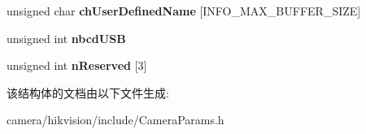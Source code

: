 \begin{DoxyCompactItemize}
\item 
\mbox{\label{struct___m_v___u_s_b3___d_e_v_i_c_e___i_n_f_o___a1feb8a6506de6f53cdff12659a5619ed}} 
unsigned char {\bfseries ch\+User\+Defined\+Name} \mbox{[}I\+N\+F\+O\+\_\+\+M\+A\+X\+\_\+\+B\+U\+F\+F\+E\+R\+\_\+\+S\+I\+ZE\mbox{]}
\item 
\mbox{\label{struct___m_v___u_s_b3___d_e_v_i_c_e___i_n_f_o___abfe305585356ce3d8712c94b4c3e7cb6}} 
unsigned int {\bfseries nbcd\+U\+SB}
\item 
\mbox{\label{struct___m_v___u_s_b3___d_e_v_i_c_e___i_n_f_o___a0881861a47a9c53cef50cfa199fdc210}} 
unsigned int {\bfseries n\+Reserved} \mbox{[}3\mbox{]}
\end{DoxyCompactItemize}


该结构体的文档由以下文件生成\+:\begin{DoxyCompactItemize}
\item 
camera/hikvision/include/Camera\+Params.\+h\end{DoxyCompactItemize}

